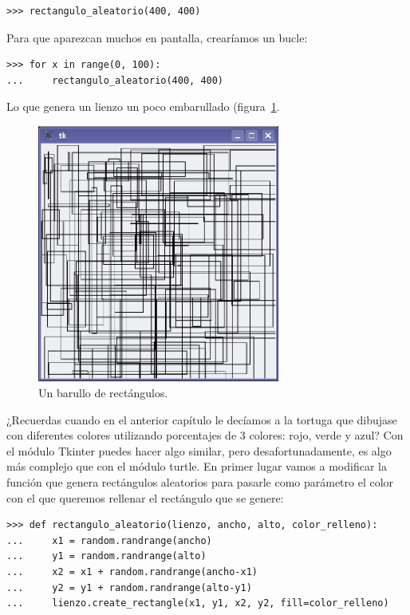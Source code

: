 \begin{listing}
\begin{verbatim}
>>> rectangulo_aleatorio(400, 400)
\end{verbatim}
\end{listing}

\noindent
Para que aparezcan muchos en pantalla, crearíamos un bucle:

\begin{listing}
\begin{verbatim}
>>> for x in range(0, 100):
...     rectangulo_aleatorio(400, 400)
\end{verbatim}
\end{listing}

\noindent
Lo que genera un lienzo un poco embarullado (figura~\ref{fig34}.

\begin{figure}
\begin{center}
\includegraphics[width=80mm]{figure34.eps}
\end{center}
\caption{Un barullo de rectángulos.}\label{fig34}
\end{figure}

¿Recuerdas cuando en el anterior capítulo le decíamos a la tortuga que dibujase con diferentes colores utilizando porcentajes de 3 colores: rojo, verde y azul? Con el módulo Tkinter puedes hacer algo similar, pero desafortunadamente, es algo más complejo que con el módulo turtle.  En primer lugar vamos a modificar la función que genera rectángulos aleatorios para pasarle como parámetro el color con el que queremos rellenar el rectángulo que se genere:

\begin{listing}
\begin{verbatim}
>>> def rectangulo_aleatorio(lienzo, ancho, alto, color_relleno):
...     x1 = random.randrange(ancho)
...     y1 = random.randrange(alto)
...     x2 = x1 + random.randrange(ancho-x1)
...     y2 = y1 + random.randrange(alto-y1)
...     lienzo.create_rectangle(x1, y1, x2, y2, fill=color_relleno)
\end{verbatim}
\end{listing}

